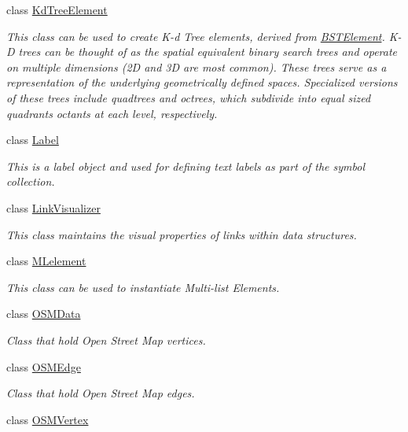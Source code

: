 \begin{DoxyCompactItemize}
class \mbox{\hyperlink{classbridges_1_1_kd_tree_element}{Kd\+Tree\+Element}}
\begin{DoxyCompactList}\small\item\em This class can be used to create K-\/d Tree elements, derived from \mbox{\hyperlink{classbridges_1_1_b_s_t_element}{B\+S\+T\+Element}}. K-\/D trees can be thought of as the spatial equivalent binary search trees and operate on multiple dimensions (2D and 3D are most common). These trees serve as a representation of the underlying geometrically defined spaces. Specialized versions of these trees include quadtrees and octrees, which subdivide into equal sized quadrants octants at each level, respectively. \end{DoxyCompactList}\item 
class \mbox{\hyperlink{classbridges_1_1_label}{Label}}
\begin{DoxyCompactList}\small\item\em This is a label object and used for defining text labels as part of the symbol collection. \end{DoxyCompactList}\item 
class \mbox{\hyperlink{classbridges_1_1_link_visualizer}{Link\+Visualizer}}
\begin{DoxyCompactList}\small\item\em This class maintains the visual properties of links within data structures. \end{DoxyCompactList}\item 
class \mbox{\hyperlink{classbridges_1_1_m_lelement}{M\+Lelement}}
\begin{DoxyCompactList}\small\item\em This class can be used to instantiate Multi-\/list Elements. \end{DoxyCompactList}\item 
class \mbox{\hyperlink{classbridges_1_1_o_s_m_data}{O\+S\+M\+Data}}
\begin{DoxyCompactList}\small\item\em Class that hold Open Street Map vertices. \end{DoxyCompactList}\item 
class \mbox{\hyperlink{classbridges_1_1_o_s_m_edge}{O\+S\+M\+Edge}}
\begin{DoxyCompactList}\small\item\em Class that hold Open Street Map edges. \end{DoxyCompactList}\item 
class \mbox{\hyperlink{classbridges_1_1_o_s_m_vertex}{O\+S\+M\+Vertex}}

\end{DoxyCompactItemize}
